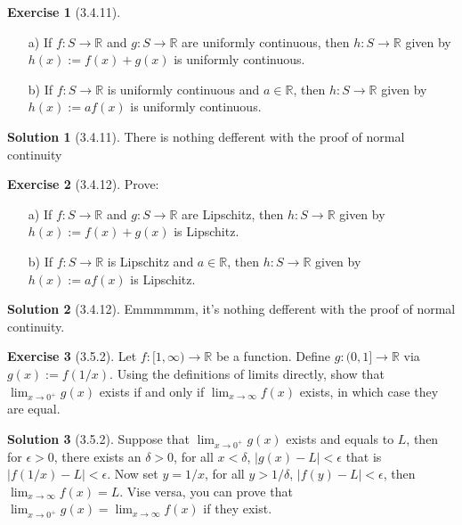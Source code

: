 \documentclass{article}
\theoremstyle{definition}
\newtheorem{exe}{Exercise}[section]
\newtheorem{sol}{Solution}[exe]
\begin{document}
\begin{exe}[3.4.11]
    \begin{enumerate}
        \item[a)] If \( f: S \rightarrow \mathbb{R} \) and \( g: S \rightarrow \mathbb{R} \) are uniformly continuous, then \( h: S \rightarrow \mathbb{R} \) given by \( h(x) := f(x) + g(x) \) is uniformly continuous.
        \item[b)] If \( f: S \rightarrow \mathbb{R} \) is uniformly continuous and \( a \in \mathbb{R} \), then \( h: S \rightarrow \mathbb{R} \) given by \( h(x) := a f(x) \) is uniformly continuous.
    \end{enumerate}
\end{exe}

\begin{sol}[3.4.11]
There is nothing defferent with the proof of normal continuity
\end{sol}


\begin{exe}[3.4.12]
    Prove:
    \begin{enumerate}
        \item[a)] If \( f: S \rightarrow \mathbb{R} \) and \( g: S \rightarrow \mathbb{R} \) are Lipschitz, then \( h: S \rightarrow \mathbb{R} \) given by \( h(x) := f(x) + g(x) \) is Lipschitz.
        \item[b)] If \( f: S \rightarrow \mathbb{R} \) is Lipschitz and \( a \in \mathbb{R} \), then \( h: S \rightarrow \mathbb{R} \) given by \( h(x) := a f(x) \) is Lipschitz.
    \end{enumerate}
\end{exe}



\begin{sol}[3.4.12]
Emmmmmm, it's nothing defferent with the proof of normal continuity.
\end{sol}


\begin{exe}[3.5.2]
    Let \( f: [1, \infty) \rightarrow \mathbb{R} \) be a function. Define \( g: (0, 1] \rightarrow \mathbb{R} \) via \( g(x) := f(1/x) \). Using the definitions of limits directly, show that \( \lim_{x \rightarrow 0^+} g(x) \) exists if and only if \( \lim_{x \rightarrow \infty} f(x) \) exists, in which case they are equal.
\end{exe}


\begin{sol}[3.5.2]

Suppose that $\lim_{x\to 0^+}g(x)$ exists and equals to $L$, then for $\epsilon>0$, there exists an $\delta >0$, for all $x<\delta$, $|g(x)-L|<\epsilon$ that is $|f(1/x)-L|<\epsilon$. Now set $y=1/x$, for all $y>1/\delta$, 
$|f(y)-L|<\epsilon$, then $\lim_{x\to\infty}f(x)=L$. Vise versa, you can prove that $\lim_{x\to0^+}g(x)=\lim_{x\to\infty}f(x)$ if they exist.

\end{sol}
\end{document}
